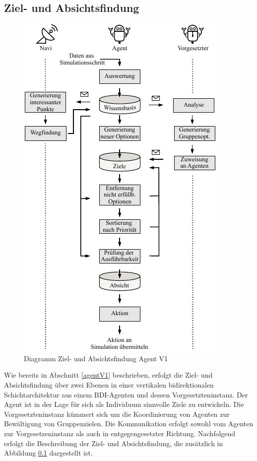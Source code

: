 \documentclass[runningheads]{llncs}
\begin{document}
	\subsection{Ziel- und Absichtsfindung}\label{absichtsfindung}
	\begin{figure}[t]
		\centering
		\includegraphics[scale=1]{./Referenzen/Entscheidungsfindung.pdf}
		\caption{Diagramm Ziel- und Absichtsfindung Agent V1}
		\label{desires}
	\end{figure}
	Wie bereits in Abschnitt \ref{agentV1} beschrieben, erfolgt die Ziel- und Absichtsfindung über zwei Ebenen in einer vertikalen bidirektionalen Schichtarchitektur aus einem BDI-Agenten und dessen Vorgesetzteninstanz. Der Agent ist in der Lage für sich als Individuum sinnvolle Ziele zu entwickeln. Die Vorgesetzteninstanz kümmert sich um die Koordinierung von Agenten zur Bewältigung von Gruppenzielen. Die Kommunikation erfolgt sowohl vom Agenten zur Vorgesetzeninstanz als auch in entgegengesetzter Richtung. Nachfolgend erfolgt die Beschreibung der Ziel- und Absichtsfindung, die zusätzlich in Abbildung \ref{absichtsfindung} dargestellt ist.
	
\end{document}

